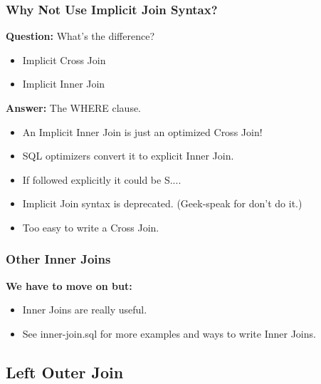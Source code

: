 \documentclass{beamer}
\begin{document}
\begin{frame} %
  \frametitle{Why Not Use Implicit Join Syntax?}

  \textbf{Question:} What's the difference?
  \begin{itemize}
  \item Implicit Cross Join
  \item Implicit Inner Join
  \end{itemize}
  
  \bigskip
  \pause
  \textbf{Answer:} The WHERE clause.
  
  \bigskip
  \begin{itemize}
  \item An Implicit Inner Join is just an optimized Cross Join!
  \item SQL optimizers convert it to explicit Inner Join.
  \item If followed explicitly it could be S.\@L.\@O.\@W.\@
  \item Implicit Join syntax is deprecated. (Geek-speak for don't do
    it.)
  \item Too easy to write a Cross Join.
  \end{itemize}

  
\end{frame}

\begin{frame}
  \frametitle{Other Inner Joins}

  \textbf{We have to move on but:}
  \begin{itemize}
  \item Inner Joins are really useful.
  \item See inner-join.sql for more examples and ways to write Inner Joins.
  \end{itemize}

\end{frame}

\subsection{Left Outer Join} %
\end{document}
